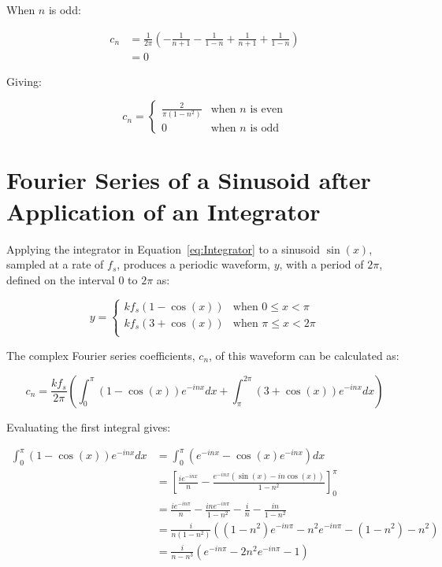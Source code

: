 \begin{appendices}
		When $n$ is odd:

		\begin{align}
			c_{n} & = \frac{1}{2\pi} \left( -\frac{1}{n+1} - 
				\frac{1}{1-n} + \frac{1}{n+1} + \frac{1}{1-n} \right) \nonumber \\[0.6em]
			& = 0 \nonumber
		\end{align}

		Giving:

		\[ c_{n} = \begin{cases}
				\frac{2}{\pi(1 - n^{2})} & \text{when $n$ is even} \\
				0 & \text{when $n$ is odd}
			\end{cases} \]

	\section{Fourier Series of a Sinusoid after Application of an Integrator}
	\label{app:MathematicalDerivations-Integrator}
		Applying the integrator in Equation~\ref{eq:Integrator} to a sinusoid $\sin(x)$, sampled at a rate of
		$f_{s}$, produces a periodic waveform, $y$, with a period of $2\pi$, defined on the interval $0$ to $2\pi$
		as:

		\[ y = \begin{cases}
				kf_{s} (1 - \cos(x)) & \text{when $0 \leq x < \pi$} \\
				kf_{s} (3 + \cos(x)) & \text{when $\pi \leq x < 2\pi$} \\
			\end{cases} \]

		The complex Fourier series coefficients, $c_{n}$, of this waveform can be calculated as:

		\[ c_{n} = \frac{kf_{s}}{2\pi} \left( \int_{0}^{\pi} (1-\cos(x))e^{-inx} dx
						      + \int_{\pi}^{2\pi} (3 + \cos(x))e^{-inx} dx \right) \]

		Evaluating the first integral gives:
		
		\begin{align}
			\int_{0}^{\pi} (1-\cos(x))e^{-inx} dx & = 
				\int_{0}^{\pi} \left( e^{-inx} - \cos(x)e^{-inx} \right) dx \nonumber \\[0.6em]
			& = \left[ \frac{ie^{-inx}}{n} - \frac{e^{-inx}(\sin(x) 
				- in\cos(x))}{1 - n^{2}} \right]_{0}^{\pi} \nonumber \\[0.6em]
			& = \frac{ie^{-in\pi}}{n} - \frac{ine^{-in\pi}}{1 - n^{2}} 
				- \frac{i}{n} - \frac{in}{1 - n^{2}} \nonumber \\[0.6em]
			& = \frac{i}{n(1-n^{2})} \left( (1 - n^{2})e^{-in\pi} - 
				n^{2}e^{-in\pi} - (1 - n^{2}) - n^2 \right) \nonumber \\[0.6em]
			& = \frac{i}{n - n^{3}} \left( e^{-in\pi} - 2n^{2}e^{-in\pi} - 1 \right) \nonumber
		\end{align}


\end{appendices}
